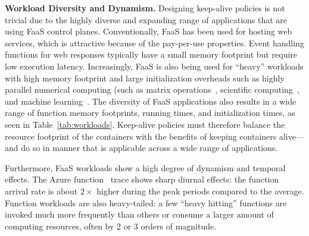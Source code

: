 \noindent \textbf{Workload Diversity and Dynamism.}
%
Designing keep-alive policies is not trivial due to the highly diverse and expanding range of applications that are using FaaS control planes.
Conventionally, FaaS has been used for hosting web services, which is attractive because of the pay-per-use properties. 
Event handling functions for web responses typically have a small memory footprint but require low execution latency. 
Increasingly, FaaS is also being used for ``heavy'' workloads with high memory footprint and large initialization overheads such as highly parallel numerical computing (such as matrix operations~\cite{jonas2017occupy}, scientific computing~\cite{shankar2018numpywren}, and machine learning~\cite{akkus_sand_2018}. 
The diversity of FaaS applications also results in a wide range of function memory footprints, running times, and initialization times, as seen in Table~\ref{tab:workloads}.  
Keep-alive policies must therefore balance the resource footprint of the containers with the benefits of keeping containers alive---and do so in manner that is applicable across a wide range of applications. 


Furthermore, FaaS workloads show a high degree of dynamism and temporal effects. 
The Azure function~\cite{shahrad_serverless_2020} trace shows sharp diurnal effects: the function arrival rate is about $2\times$ higher during the peak periods compared to the average. 
Function workloads are also heavy-tailed: a few ``heavy hitting'' functions are invoked much more frequently than others or consume a larger amount of computing resources, often by 2 or 3 orders of magnitude. 



